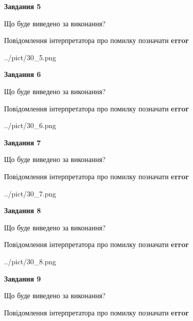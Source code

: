 \documentclass[11pt, ukrainian]{article}
\begin{document}
{\begin {large}
{\begin {center}\textbf{Завдання 5}\end {center}}\par
Що буде виведено за виконання? \par
Повідомлення інтерпретатора про помилку позначати \textbf{error}

\begin{center}
	{../pict/30_5.png}
\end{center}
\newpage

{\begin {center}\textbf{Завдання 6}\end {center}}\par
Що буде виведено за виконання? \par
Повідомлення інтерпретатора про помилку позначати \textbf{error}

\begin{center}
	{../pict/30_6.png}
\end{center}
\newpage

{\begin {center}\textbf{Завдання 7}\end {center}}\par
Що буде виведено за виконання? \par
Повідомлення інтерпретатора про помилку позначати \textbf{error}

\begin{center}
	{../pict/30_7.png}
\end{center}
\newpage

{\begin {center}\textbf{Завдання 8}\end {center}}\par
Що буде виведено за виконання? \par
Повідомлення інтерпретатора про помилку позначати \textbf{error}

\begin{center}
	{../pict/30_8.png}
\end{center}
\newpage

{\begin {center}\textbf{Завдання 9}\end {center}}\par
Що буде виведено за виконання? \par
Повідомлення інтерпретатора про помилку позначати \textbf{error}


\end{large}}
\end{document}
